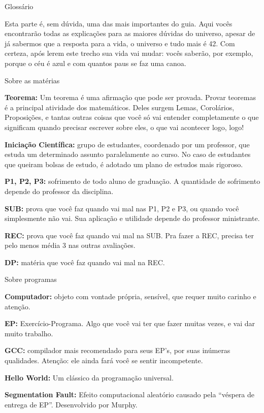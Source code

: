 \begin{secao}{Glossário}

Esta parte é, sem dúvida, uma das mais importantes do guia. Aqui vocês
encontrarão todas as explicações para as maiores dúvidas do universo, apesar de
já sabermos que a resposta para a vida, o universo e tudo mais é 42. Com
certeza, após lerem este trecho sua vida vai mudar: vocês saberão, por exemplo,
porque o céu é azul e com quantos paus se faz uma canoa.

\begin{subsecao}{Sobre as matérias}

{\bf Teorema:} Um teorema é uma afirmação que pode ser provada. Provar
teoremas é a principal atividade dos matemáticos. Deles surgem Lemas,
Corolários, Proposições, e tantas outras coisas que você só vai entender
completamente o que significam quando precisar escrever sobre eles, o que vai
acontecer logo, logo!

{\bf Iniciação Científica:} grupo de estudantes, coordenado por um professor, que
estuda um determinado assunto paralelamente ao curso. No caso de estudantes que
queiram bolsas de estudo, é adotado um plano de estudos mais rigoroso.

{\bf P1, P2, P3:} sofrimento de todo aluno de graduação. A quantidade de sofrimento
depende do professor da disciplina.

{\bf SUB:} prova que você faz quando vai mal nas P1, P2 e P3, ou
quando você simplesmente não vai. Sua aplicação e utilidade depende do
professor ministrante.

{\bf REC:} prova que você faz quando vai mal na SUB. Pra fazer a REC, precisa ter
pelo menos média 3 nas outras avaliações.

{\bf DP:} matéria que você faz quando vai mal na REC.
\end{subsecao}

\begin{subsecao}{Sobre programas}

{\bf Computador:} objeto com vontade própria, sensível, que requer muito
carinho e atenção.

{\bf EP:} Exercício-Programa. Algo que você vai ter que fazer muitas vezes, e
vai dar muito trabalho.

{\bf GCC:} compilador mais recomendado para seus EP's, por suas inúmeras
qualidades. Atenção: ele ainda fará você se sentir incompetente.

{\bf Hello World:} Um clássico da programação universal.

{\bf Segmentation Fault:} Efeito computacional aleatório causado pela ``véspera
de entrega de EP''. Desenvolvido por Murphy.


\end{subsecao}
\end{secao}
